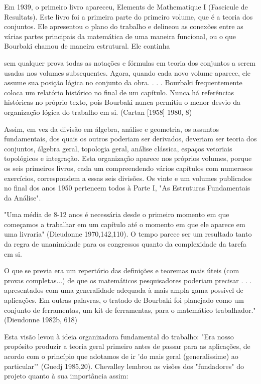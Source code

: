 \documentclass[12pt]{article}
\begin{document}
Em 1939, o primeiro livro apareceu, Elements de Mathematique I (Fascicule de Resultats). Este livro foi a primeira parte do primeiro volume, que é a teoria dos conjuntos. Ele apresentou o plano do trabalho e delineou as conexões entre as várias partes principais da matemática de uma maneira funcional, ou o que Bourbaki chamou de maneira estrutural. Ele continha

sem qualquer prova todas as notações e fórmulas em teoria dos conjuntos a serem usadas nos volumes subsequentes. Agora, quando cada novo volume aparece, ele assume sua posição lógica no conjunto da obra. . . . Bourbaki frequentemente coloca um relatório histórico no final de um capítulo. Nunca há referências históricas no próprio texto, pois Bourbaki nunca permitiu o menor desvio da organização lógica do trabalho em si. (Cartan [1958] 1980, 8)

Assim, em vez da divisão em álgebra, análise e geometria, os assuntos fundamentais, dos quais os outros poderiam ser derivados, deveriam ser teoria dos conjuntos, álgebra geral, topologia geral, análise clássica, espaços vetoriais topológicos e integração. Esta organização aparece nos próprios volumes, porque os seis primeiros livros, cada um compreendendo vários capítulos com numerosos exercícios, correspondem a essas seis divisões. Os vinte e um volumes publicados no final dos anos 1950 pertencem todos à Parte I, "As Estruturas Fundamentais da Análise".

"Uma média de 8-12 anos é necessária desde o primeiro momento em que começamos a trabalhar em um capítulo até o momento em que ele aparece em uma livraria" (Dieudonne 1970,142,110). O tempo parece ser um resultado tanto da regra de unanimidade para os congressos quanto da complexidade da tarefa em si.

O que se previa era um repertório das definições e teoremas mais úteis (com provas completas...) de que os matemáticos pesquisadores poderiam precisar . . . apresentados com uma generalidade adequada à mais ampla gama possível de aplicações. Em outras palavras, o tratado de Bourbaki foi planejado como um conjunto de ferramentas, um kit de ferramentas, para o matemático trabalhador."(Dieudonne 1982b, 618)

Esta visão levou à ideia organizadora fundamental do trabalho: "Era nosso propósito produzir a teoria geral primeiro antes de passar para as aplicações, de acordo com o princípio que adotamos de ir 'do mais geral (generalissime) ao particular'" (Guedj 1985,20). Chevalley lembrou as visões dos "fundadores" do projeto quanto à sua importância assim:
\end{document}
